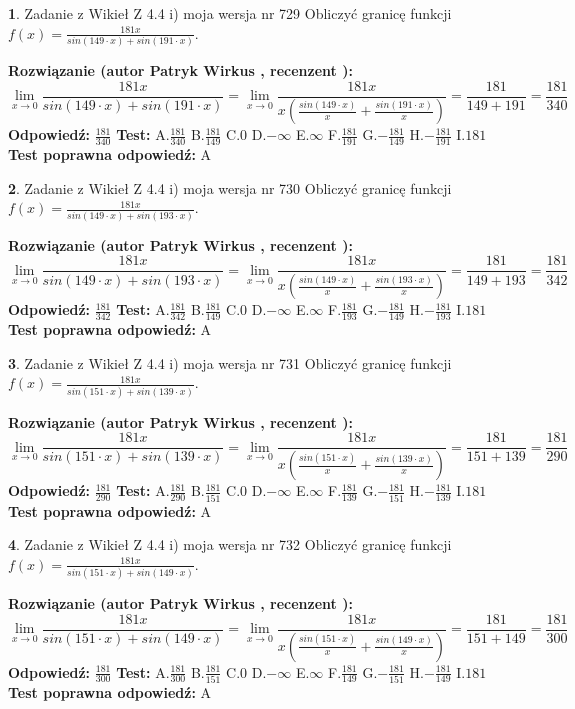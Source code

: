 \documentclass[12pt, a4paper]{article}
\theoremstyle{definition} %
\newtheorem{zad}{}
\newcommand{\zadStart}[1]{\begin{zad}#1\newline}
\newcommand{\zadStop}{\end{zad}}
\newcommand{\rozwStart}[2]{\noindent \textbf{Rozwiązanie (autor #1 , recenzent #2): }\newline}
\newcommand{\rozwStop}{\newline}
\newcommand{\odpStart}{\noindent \textbf{Odpowiedź:}\newline}
\newcommand{\odpStop}{\newline}
\newcommand{\testStart}{\noindent \textbf{Test:}\newline}
\newcommand{\testStop}{\newline}
\newcommand{\kluczStart}{\noindent \textbf{Test poprawna odpowiedź:}\newline}
\newcommand{\kluczStop}{\newline}
\begin{document}
\zadStart{Zadanie z Wikieł Z 4.4 i) moja wersja nr 729}
Obliczyć granicę funkcji $f(x)=\frac{181x}{sin(149\cdot x) +sin(191\cdot x)}$.
\zadStop
\rozwStart{Patryk Wirkus}{}
$$\lim\limits_{x\to 0}\frac{181x}{sin(149\cdot x) +sin(191\cdot x)}=\lim\limits_{x\to 0}\frac{181x}{x(\frac{sin(149\cdot x)}{x}+\frac{sin(191\cdot x)}{x})}=\frac{181}{149+191} = \frac{181}{340}$$
\rozwStop
\odpStart
$\frac{181}{340}$
\odpStop
\testStart
A.$\frac{181}{340}$
B.$\frac{181}{149}$
C.$0$
D.$-\infty$
E.$\infty$
F.$\frac{181}{191}$
G.$-\frac{181}{149}$
H.$-\frac{181}{191}$
I.$181$
\testStop
\kluczStart
A
\kluczStop



\zadStart{Zadanie z Wikieł Z 4.4 i) moja wersja nr 730}
Obliczyć granicę funkcji $f(x)=\frac{181x}{sin(149\cdot x) +sin(193\cdot x)}$.
\zadStop
\rozwStart{Patryk Wirkus}{}
$$\lim\limits_{x\to 0}\frac{181x}{sin(149\cdot x) +sin(193\cdot x)}=\lim\limits_{x\to 0}\frac{181x}{x(\frac{sin(149\cdot x)}{x}+\frac{sin(193\cdot x)}{x})}=\frac{181}{149+193} = \frac{181}{342}$$
\rozwStop
\odpStart
$\frac{181}{342}$
\odpStop
\testStart
A.$\frac{181}{342}$
B.$\frac{181}{149}$
C.$0$
D.$-\infty$
E.$\infty$
F.$\frac{181}{193}$
G.$-\frac{181}{149}$
H.$-\frac{181}{193}$
I.$181$
\testStop
\kluczStart
A
\kluczStop



\zadStart{Zadanie z Wikieł Z 4.4 i) moja wersja nr 731}
Obliczyć granicę funkcji $f(x)=\frac{181x}{sin(151\cdot x) +sin(139\cdot x)}$.
\zadStop
\rozwStart{Patryk Wirkus}{}
$$\lim\limits_{x\to 0}\frac{181x}{sin(151\cdot x) +sin(139\cdot x)}=\lim\limits_{x\to 0}\frac{181x}{x(\frac{sin(151\cdot x)}{x}+\frac{sin(139\cdot x)}{x})}=\frac{181}{151+139} = \frac{181}{290}$$
\rozwStop
\odpStart
$\frac{181}{290}$
\odpStop
\testStart
A.$\frac{181}{290}$
B.$\frac{181}{151}$
C.$0$
D.$-\infty$
E.$\infty$
F.$\frac{181}{139}$
G.$-\frac{181}{151}$
H.$-\frac{181}{139}$
I.$181$
\testStop
\kluczStart
A
\kluczStop



\zadStart{Zadanie z Wikieł Z 4.4 i) moja wersja nr 732}
Obliczyć granicę funkcji $f(x)=\frac{181x}{sin(151\cdot x) +sin(149\cdot x)}$.
\zadStop
\rozwStart{Patryk Wirkus}{}
$$\lim\limits_{x\to 0}\frac{181x}{sin(151\cdot x) +sin(149\cdot x)}=\lim\limits_{x\to 0}\frac{181x}{x(\frac{sin(151\cdot x)}{x}+\frac{sin(149\cdot x)}{x})}=\frac{181}{151+149} = \frac{181}{300}$$
\rozwStop
\odpStart
$\frac{181}{300}$
\odpStop
\testStart
A.$\frac{181}{300}$
B.$\frac{181}{151}$
C.$0$
D.$-\infty$
E.$\infty$
F.$\frac{181}{149}$
G.$-\frac{181}{151}$
H.$-\frac{181}{149}$
I.$181$
\testStop
\kluczStart
A
\kluczStop
\end{document}
